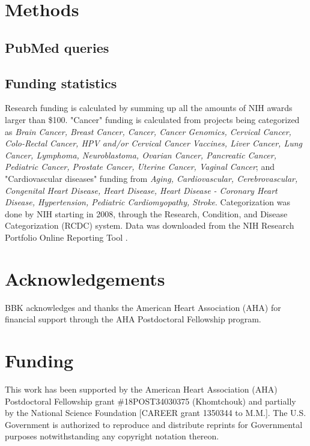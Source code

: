 \documentclass[letter]{bib}
\begin{document}
\section*{Methods}
\begin{method}
    \subsection*{PubMed queries}
    
    \subsection*{Funding statistics}
     Research funding is calculated by summing up all the amounts of NIH awards larger than \$100. "Cancer" funding is calculated from projects being categorized as \protect\textit{Brain Cancer, Breast Cancer, Cancer, Cancer Genomics, Cervical Cancer, Colo-Rectal Cancer, HPV and/or Cervical Cancer Vaccines, Liver Cancer, Lung Cancer, Lymphoma, Neuroblastoma, Ovarian Cancer, Pancreatic Cancer, Pediatric Cancer, Prostate Cancer, Uterine Cancer, Vaginal Cancer}; and "Cardiovascular diseases" funding from {\protect\textit{Aging, Cardiovascular, Cerebrovascular, Congenital Heart Disease, Heart Disease, Heart Disease - Coronary Heart Disease, Hypertension, Pediatric Cardiomyopathy, Stroke}}. Categorization was done by NIH starting in 2008, through the Research, Condition, and Disease Categorization (RCDC) system. Data was downloaded from the NIH Research Portfolio Online Reporting Tool \citep{NationalInstituteofHealth:2018:Estimates}.
\end{method}
	\enlargethispage{12pt}
	
	
	
	
	\section*{Acknowledgements}
	
	BBK acknowledges and thanks the American Heart Association (AHA) for financial support through the AHA Postdoctoral Fellowship program.
	\vspace*{-12pt}
	
	\section*{Funding}
	
	This work has been supported by the American Heart Association (AHA) Postdoctoral Fellowship grant \#18POST34030375 (Khomtchouk) and partially by the National Science Foundation [CAREER grant 1350344 to M.M.]. The U.S. Government is authorized to reproduce and distribute reprints for Governmental purposes notwithstanding any copyright notation thereon.\vspace*{-12pt}
	
\end{document}
